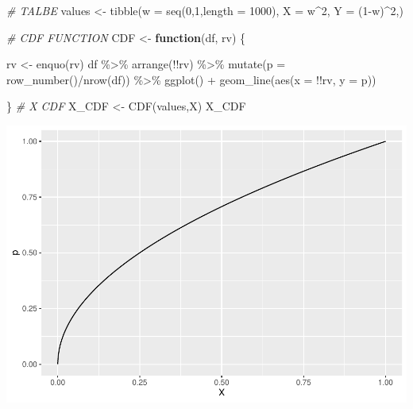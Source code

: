 \documentclass[
]{article}
\newenvironment{Shaded}{\begin{snugshade}}{\end{snugshade}}
\newcommand{\AttributeTok}[1]{\textcolor[rgb]{0.77,0.63,0.00}{#1}}
\newcommand{\CommentTok}[1]{\textcolor[rgb]{0.56,0.35,0.01}{\textit{#1}}}
\newcommand{\ControlFlowTok}[1]{\textcolor[rgb]{0.13,0.29,0.53}{\textbf{#1}}}
\newcommand{\DecValTok}[1]{\textcolor[rgb]{0.00,0.00,0.81}{#1}}
\newcommand{\FunctionTok}[1]{\textcolor[rgb]{0.00,0.00,0.00}{#1}}
\newcommand{\NormalTok}[1]{#1}
\newcommand{\OtherTok}[1]{\textcolor[rgb]{0.56,0.35,0.01}{#1}}
\newcommand{\SpecialCharTok}[1]{\textcolor[rgb]{0.00,0.00,0.00}{#1}}
\begin{document}
\begin{Shaded}
\begin{Highlighting}[]
  \CommentTok{\# TALBE}
\NormalTok{    values }\OtherTok{\textless{}{-}} \FunctionTok{tibble}\NormalTok{(}\AttributeTok{w =} \FunctionTok{seq}\NormalTok{(}\DecValTok{0}\NormalTok{,}\DecValTok{1}\NormalTok{,}\AttributeTok{length =} \DecValTok{1000}\NormalTok{),}
                     \AttributeTok{X =}\NormalTok{ w}\SpecialCharTok{\^{}}\DecValTok{2}\NormalTok{,}
                     \AttributeTok{Y =}\NormalTok{ (}\DecValTok{1}\SpecialCharTok{{-}}\NormalTok{w)}\SpecialCharTok{\^{}}\DecValTok{2}\NormalTok{,)}
    
  \CommentTok{\# CDF FUNCTION}
\NormalTok{    CDF }\OtherTok{\textless{}{-}} \ControlFlowTok{function}\NormalTok{(df, rv) \{}
      
\NormalTok{      rv }\OtherTok{\textless{}{-}} \FunctionTok{enquo}\NormalTok{(rv)}
\NormalTok{      df }\SpecialCharTok{\%\textgreater{}\%} 
        \FunctionTok{arrange}\NormalTok{(}\SpecialCharTok{!!}\NormalTok{rv) }\SpecialCharTok{\%\textgreater{}\%} 
        \FunctionTok{mutate}\NormalTok{(}\AttributeTok{p =} \FunctionTok{row\_number}\NormalTok{()}\SpecialCharTok{/}\FunctionTok{nrow}\NormalTok{(df)) }\SpecialCharTok{\%\textgreater{}\%} 
        \FunctionTok{ggplot}\NormalTok{() }\SpecialCharTok{+}
        \FunctionTok{geom\_line}\NormalTok{(}\FunctionTok{aes}\NormalTok{(}\AttributeTok{x =} \SpecialCharTok{!!}\NormalTok{rv, }\AttributeTok{y =}\NormalTok{ p)) }
      
\NormalTok{    \}}
  \CommentTok{\# X CDF}
\NormalTok{    X\_CDF }\OtherTok{\textless{}{-}} \FunctionTok{CDF}\NormalTok{(values,X)}
\NormalTok{    X\_CDF}
\end{Highlighting}
\end{Shaded}

\includegraphics{HW-3_files/figure-latex/unnamed-chunk-1-1.pdf}
\end{document}
